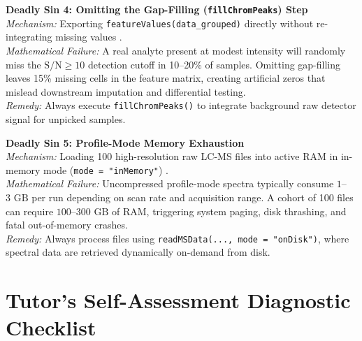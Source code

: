 \documentclass[11pt,twoside,openright]{book}
\begin{document}
\begin{pitfallbox}
\textbf{Deadly Sin 4: Omitting the Gap-Filling (\texttt{fillChromPeaks}) Step}\\
\textit{Mechanism:} Exporting \texttt{featureValues(data\_grouped)} directly without re-integrating missing values \cite{benton2015evaluating}.\\
\textit{Mathematical Failure:} A real analyte present at modest intensity will randomly miss the $\text{S/N} \ge 10$ detection cutoff in 10--20\% of samples. Omitting gap-filling leaves 15\% missing cells in the feature matrix, creating artificial zeros that mislead downstream imputation and differential testing.\\
\textit{Remedy:} Always execute \texttt{fillChromPeaks()} to integrate background raw detector signal for unpicked samples.
\end{pitfallbox}

\begin{pitfallbox}
\textbf{Deadly Sin 5: Profile-Mode Memory Exhaustion}\\
\textit{Mechanism:} Loading 100 high-resolution raw LC-MS files into active RAM in in-memory mode (\texttt{mode = "inMemory"}) \cite{gatto2012msnbase}.\\
\textit{Mathematical Failure:} Uncompressed profile-mode spectra typically consume $1$--$3\text{ GB}$ per run depending on scan rate and acquisition range. A cohort of 100 files can require $100$--$300\text{ GB}$ of RAM, triggering system paging, disk thrashing, and fatal out-of-memory crashes.\\
\textit{Remedy:} Always process files using \texttt{readMSData(..., mode = "onDisk")}, where spectral data are retrieved dynamically on-demand from disk.
\end{pitfallbox}

\section{Tutor's Self-Assessment Diagnostic Checklist}
\end{document}
